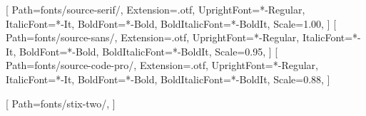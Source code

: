 %

\usepackage[a4paper,
            inner=2.5cm, outer=4.5cm,
            top=2.0cm, bottom=2.5cm,
            marginparwidth=2.7cm, marginparsep=0.15cm,
            headheight=15pt]{geometry}

\usepackage{fontspec}
\setmainfont{SourceSerif4}[
  Path=fonts/source-serif/,
  Extension=.otf,
  UprightFont=*-Regular,
  ItalicFont=*-It,
  BoldFont=*-Bold,
  BoldItalicFont=*-BoldIt,
  Scale=1.00,
]
\setsansfont{SourceSans3}[
  Path=fonts/source-sans/,
  Extension=.otf,
  UprightFont=*-Regular,
  ItalicFont=*-It,
  BoldFont=*-Bold,
  BoldItalicFont=*-BoldIt,
  Scale=0.95,
]
\setmonofont{SourceCodePro}[
  Path=fonts/source-code-pro/,
  Extension=.otf,
  UprightFont=*-Regular,
  ItalicFont=*-It,
  BoldFont=*-Bold,
  BoldItalicFont=*-BoldIt,
  Scale=0.88,
]
\newfontfamily{}

\usepackage[ngerman]{babel}
\addto{}
\usepackage{microtype}

\usepackage{amsmath}
\usepackage{unicode-math}
[
  Path=fonts/stix-two/,
]

